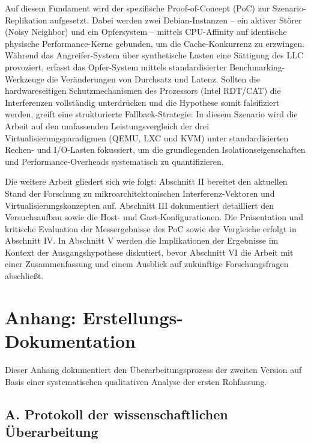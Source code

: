 \documentclass[conference]{IEEEtran}
\begin{document}
Auf diesem Fundament wird der spezifische Proof-of-Concept (PoC) zur
Szenario-Replikation aufgesetzt. Dabei werden zwei Debian-Instanzen – ein
aktiver Störer (Noisy Neighbor) und ein Opfersystem – mittels CPU-Affinity auf
identische physische Performance-Kerne gebunden, um die Cache-Konkurrenz zu
erzwingen. Während das Angreifer-System über synthetische Lasten eine Sättigung
des LLC provoziert, erfasst das Opfer-System mittels standardisierter
Benchmarking-Werkzeuge die Veränderungen von Durchsatz und Latenz. Sollten die
hardwareseitigen Schutzmechanismen des Prozessors (Intel RDT/CAT) die
Interferenzen vollständig unterdrücken und die Hypothese somit falsifiziert
werden, greift eine strukturierte Fallback-Strategie: In diesem Szenario wird
die Arbeit auf den umfassenden Leistungsvergleich der drei
Virtualisierungsparadigmen (QEMU, LXC und KVM) unter standardisierten Rechen-
und I/O-Lasten fokussiert, um die grundlegenden Isolationseigenschaften und
Performance-Overheads systematisch zu quantifizieren.

Die weitere Arbeit gliedert sich wie folgt: Abschnitt II bereitet den aktuellen
Stand der Forschung zu mikroarchitektonischen Interferenz-Vektoren und
Virtualisierungskonzepten auf. Abschnitt III dokumentiert detailliert den
Versuchsaufbau sowie die Host- und Gast-Konfigurationen. Die Präsentation und
kritische Evaluation der Messergebnisse des PoC sowie der Vergleiche erfolgt
in Abschnitt IV. In Abschnitt V werden die Implikationen der Ergebnisse im
Kontext der Ausgangshypothese diskutiert, bevor Abschnitt VI die Arbeit mit
einer Zusammenfassung und einem Ausblick auf zukünftige Forschungsfragen
abschließt.




\clearpage
\onecolumn

\section*{Anhang: Erstellungs-Dokumentation}

\noindent
Dieser Anhang dokumentiert den Überarbeitungsprozess der zweiten Version
auf Basis einer systematischen qualitativen Analyse der ersten Rohfassung.

\subsection*{A. Protokoll der wissenschaftlichen Überarbeitung}
\end{document}
